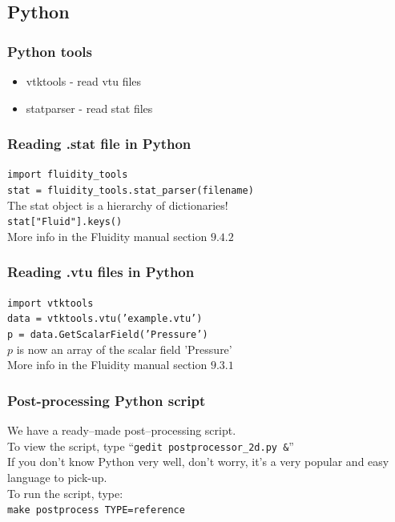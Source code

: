 \documentclass[12pt]{beamer}
\begin{document}
\subsection{Python}
\begin{frame}
    \frametitle{Python tools}
\begin{itemize}
\item vtktools - read vtu files 
\item statparser - read stat files
\end{itemize}
\end{frame}

\begin{frame}
  \frametitle{Reading .stat file in Python}
\texttt{import fluidity\_tools} \\
\texttt{stat = fluidity\_tools.stat\_parser(filename)} \\
\vspace{5mm}
The stat object is a hierarchy of dictionaries! \\
\vspace{5mm}
\texttt{stat["Fluid"].keys()} \\
\vspace{5mm}
More info in the Fluidity manual section $9.4.2$
\end{frame}

\begin{frame}
  \frametitle{Reading .vtu files in Python}

\texttt{import vtktools} \\
\texttt{data = vtktools.vtu(’example.vtu’)} \\
\texttt{p = data.GetScalarField(’Pressure’)} \\

\vspace{5mm}
$p$ is now an array of the scalar field 'Pressure' \\
\vspace{5mm}
More info in the Fluidity manual section $9.3.1$
\end{frame}

\begin{frame}
    \frametitle{Post-processing Python script}
We have a ready--made post--processing script.\\
\vspace{5mm}
To view the script, type ``{\tt gedit postprocessor\_2d.py \&}''\\
\vspace{5mm}
If you don't know Python very well, don't worry, it's a very popular and easy language to pick-up.\\
\vspace{5mm}
To run the script, type:\\
{\tt make postprocess TYPE=reference}
\end{frame}
\end{document}
